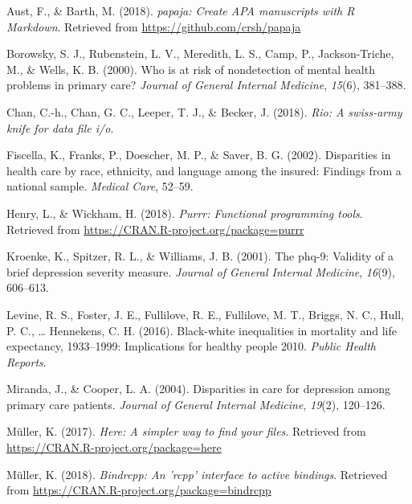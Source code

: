 \documentclass[man]{apa6}
\begin{document}
\begingroup
\setlength{\parindent}{-0.5in} \setlength{\leftskip}{0.5in}

\hypertarget{refs}{}
\hypertarget{ref-R-papaja}{}
Aust, F., \& Barth, M. (2018). \emph{papaja: Create APA manuscripts with
R Markdown}. Retrieved from \url{https://github.com/crsh/papaja}

\hypertarget{ref-borowsky2000risk}{}
Borowsky, S. J., Rubenstein, L. V., Meredith, L. S., Camp, P.,
Jackson-Triche, M., \& Wells, K. B. (2000). Who is at risk of
nondetection of mental health problems in primary care? \emph{Journal of
General Internal Medicine}, \emph{15}(6), 381--388.

\hypertarget{ref-R-rio}{}
Chan, C.-h., Chan, G. C., Leeper, T. J., \& Becker, J. (2018).
\emph{Rio: A swiss-army knife for data file i/o}.

\hypertarget{ref-fiscella2002disparities}{}
Fiscella, K., Franks, P., Doescher, M. P., \& Saver, B. G. (2002).
Disparities in health care by race, ethnicity, and language among the
insured: Findings from a national sample. \emph{Medical Care}, 52--59.

\hypertarget{ref-R-purrr}{}
Henry, L., \& Wickham, H. (2018). \emph{Purrr: Functional programming
tools}. Retrieved from \url{https://CRAN.R-project.org/package=purrr}

\hypertarget{ref-kroenke2001phq}{}
Kroenke, K., Spitzer, R. L., \& Williams, J. B. (2001). The phq-9:
Validity of a brief depression severity measure. \emph{Journal of
General Internal Medicine}, \emph{16}(9), 606--613.

\hypertarget{ref-levine2016black}{}
Levine, R. S., Foster, J. E., Fullilove, R. E., Fullilove, M. T.,
Briggs, N. C., Hull, P. C., \ldots{} Hennekens, C. H. (2016).
Black-white inequalities in mortality and life expectancy, 1933--1999:
Implications for healthy people 2010. \emph{Public Health Reports}.

\hypertarget{ref-miranda2004disparities}{}
Miranda, J., \& Cooper, L. A. (2004). Disparities in care for depression
among primary care patients. \emph{Journal of General Internal
Medicine}, \emph{19}(2), 120--126.

\hypertarget{ref-R-here}{}
Müller, K. (2017). \emph{Here: A simpler way to find your files}.
Retrieved from \url{https://CRAN.R-project.org/package=here}

\hypertarget{ref-R-bindrcpp}{}
Müller, K. (2018). \emph{Bindrcpp: An 'rcpp' interface to active
bindings}. Retrieved from
\url{https://CRAN.R-project.org/package=bindrcpp}
\end{document}
